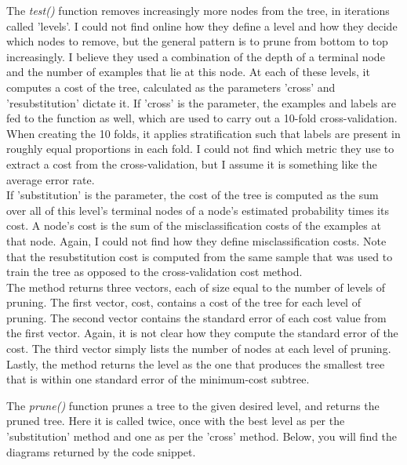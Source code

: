 The \emph{test()} function removes increasingly more nodes from the tree, in iterations called 'levels'.
I could not find online how they define a level and how they decide which nodes to remove,
but the general pattern is to prune from bottom to top increasingly.
I believe they used a combination of the depth of a terminal node and the number of examples that lie at this node.
At each of these levels, it computes a cost of the tree, calculated as the parameters 'cross' and 'resubstitution' dictate it.
If 'cross' is the parameter, the examples and labels are fed to the function as well, which are used to carry out a 10-fold
cross-validation. When creating the 10 folds, it applies stratification such that labels are present in roughly equal proportions
in each fold. I could not find which metric they use to extract a cost from the cross-validation, but I assume it is something
like the average error rate.\\
If 'substitution' is the parameter, the cost of the tree is computed as the sum over all of this level's terminal
nodes of a node's estimated probability times its cost.
A node's cost is the sum of the misclassification costs of the examples at that node.
Again, I could not find how they define misclassification costs.
Note that the resubstitution cost is computed from the same sample that was used to train the tree as opposed to the cross-validation
cost method.\\
The method returns three vectors, each of size equal to the number of levels of pruning. The first vector, cost, contains a cost
of the tree for each level of pruning. The second vector contains the standard error of each cost value from the first vector.
Again, it is not clear how they compute the standard error of the cost. The third vector simply lists the number of nodes at each
level of pruning. Lastly, the method returns the level as the one that produces the smallest tree that is within one standard
error of the minimum-cost subtree.

The \emph{prune()} function prunes a tree to the given desired level, and returns the pruned tree.
Here it is called twice, once with the best level as per the 'substitution' method and one as per the 'cross' method.
Below, you will find the diagrams returned by the code snippet.


